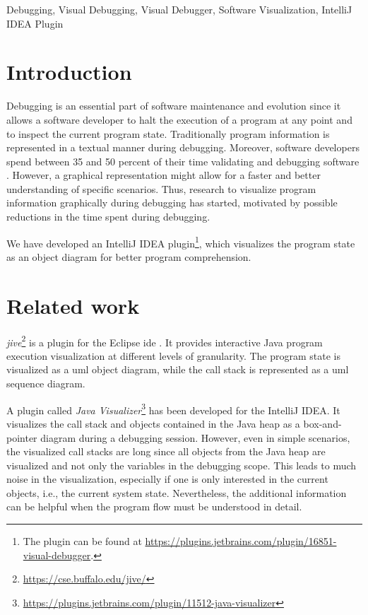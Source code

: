\documentclass[conference]{IEEEtran}
\newcommand{\intellij}{IntelliJ IDEA}
\begin{document}
\begin{IEEEkeywords}
Debugging, Visual Debugging, Visual Debugger, Software Visualization, IntelliJ IDEA Plugin
\end{IEEEkeywords}

\section{Introduction}
Debugging is an essential part of software maintenance and evolution since it allows a software developer to halt the execution of a program at any point and to inspect the current program state.
Traditionally program information is represented in a textual manner during debugging.
Moreover, software developers spend between 35 and 50 percent of their time validating and debugging software \cite{odellDebuggingMindsetUnderstanding2017}.
However, a graphical representation might allow for a faster and better understanding of specific scenarios.
Thus, research to visualize program information graphically during debugging has started, motivated by possible reductions in the time spent during debugging. 

We have developed an \intellij{} plugin\footnote{The plugin can be found at \url{https://plugins.jetbrains.com/plugin/16851-visual-debugger}.}, which visualizes the program state as an object diagram for better program comprehension.

\section{Related work} \label{sec:relatedWork}
\textit{\gls*{jive}}\footnote{\url{https://cse.buffalo.edu/jive/}} is a plugin for the Eclipse \gls*{ide} \cite{czyzDeclarativeVisualDebugging2007,k.p.FiniteStateModel2021}.
It provides interactive Java program execution visualization at different levels of granularity.
The program state is visualized as a \gls*{uml} object diagram, while the call stack is represented as a \gls*{uml} sequence diagram.

A plugin called \textit{Java Visualizer}\footnote{\url{https://plugins.jetbrains.com/plugin/11512-java-visualizer}} has been developed for the \intellij{}.
It visualizes the call stack and objects contained in the Java heap as a box-and-pointer diagram during a debugging session.
However, even in simple scenarios, the visualized call stacks are long since all objects from the Java heap are visualized and not only the variables in the debugging scope.
This leads to much noise in the visualization, especially if one is only interested in the current objects, i.e., the current system state.
Nevertheless, the additional information can be helpful when the program flow must be understood in detail. 
\end{document}
